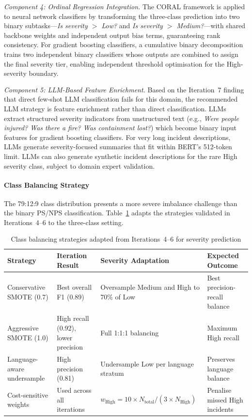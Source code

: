 \documentclass[11pt, titlepage, bibliography=totoc]{scrreprt}
\begin{document}
\textit{Component 4: Ordinal Regression Integration.}
The CORAL framework is applied to neural network classifiers by transforming the three-class prediction into two binary subtasks---\textit{Is severity $>$ Low?} and \textit{Is severity $>$ Medium?}---with shared backbone weights and independent output bias terms, guaranteeing rank consistency. For gradient boosting classifiers, a cumulative binary decomposition trains two independent binary classifiers whose outputs are combined to assign the final severity tier, enabling independent threshold optimisation for the High-severity boundary.

\textit{Component 5: LLM-Based Feature Enrichment.}
Based on the Iteration~7 finding that direct few-shot LLM classification fails for this domain, the recommended LLM strategy is feature enrichment rather than direct classification. LLMs extract structured severity indicators from unstructured text (e.g., \textit{Were people injured? Was there a fire? Was containment lost?}) which become binary input features for gradient boosting classifiers. For very long incident descriptions, LLMs generate severity-focused summaries that fit within BERT's 512-token limit. LLMs can also generate synthetic incident descriptions for the rare High severity class, subject to domain expert validation.

\paragraph{Class Balancing Strategy}
The 79:12:9 class distribution presents a more severe imbalance challenge than the binary PS/NPS classification. Table~\ref{tab:severity_balancing} adapts the strategies validated in Iterations~4--6 to the three-class setting.

\begin{table}[H]
\centering
\caption{Class balancing strategies adapted from Iterations~4--6 for severity prediction}
\label{tab:severity_balancing}
\begin{tabular}{llll}
\toprule
\textbf{Strategy} & \textbf{Iteration Result} & \textbf{Severity Adaptation} & \textbf{Expected Outcome} \\
\midrule
Conservative SMOTE (0.7) & Best overall F1 (0.89) & Oversample Medium and High to 70\% of Low & Best precision-recall balance \\
Aggressive SMOTE (1.0)   & High recall (0.92), lower precision & Full 1:1:1 balancing & Maximum High recall \\
Language-aware undersample & High precision (0.81) & Undersample Low per language stratum & Preserves language balance \\
Cost-sensitive weights   & Used across all iterations & $w_\text{High} = 10 \times N_\text{total} / (3 \times N_\text{High})$ & Penalise missed High incidents \\
\bottomrule
\end{tabular}
\end{table}
\end{document}
